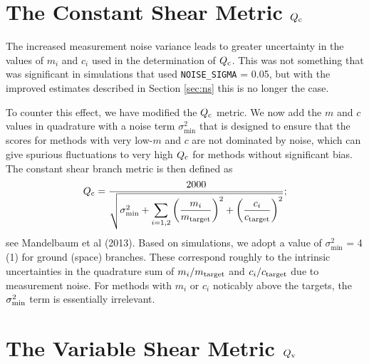 \documentclass[preprint,11pt]{aastex}
\begin{document}
\section{The Constant Shear Metric $Q_{\rm c}$}\label{sec:qc}
The increased measurement noise variance leads to greater
uncertainty in the values of $m_i$ and $c_i$ used in the determination
of $Q_{\rm c}$.  This was not something that was significant in
simulations that used \texttt{NOISE\_SIGMA} = 0.05, but with the
improved estimates described in Section \ref{sec:ns} this is no longer
the case.

To counter this effect, we have modified the $Q_{\rm c}$ metric. We
now add the $m$ and $c$ values in quadrature with a noise term
$\sigma_\text{min}^2$ that is designed to ensure that the scores for
methods with very low-$m$ and $c$ are not dominated by noise, which
can give spurious fluctuations to very high $Q_{\rm c}$ for methods
without significant bias.  The constant shear branch metric is then
defined as
\begin{equation}\label{eq:q_c}
Q_{\rm c} = \frac{2000}{\sqrt{ \sigma_\text{min}^2 + \displaystyle\sum_{i=1,2} \left(
      \frac{m_i}{m_{\rm target}} \right)^2 + \left( \frac{c_i}{c_{\rm target}} \right)^2 }};
\end{equation}
see Mandelbaum et al (2013).  Based on simulations, we adopt a value of
$\sigma_\text{min}^2$ = 4 (1) for ground (space) branches.  These
correspond roughly to the intrinsic uncertainties in the quadrature
sum of $m_i / m_{\rm target}$ and $c_i / c_{\rm target}$ due to
measurement noise. For methods with $m_i$ or $c_i$ noticably above the
targets, the $\sigma^2_{\rm min}$ term is essentially irrelevant.

\section{The Variable Shear Metric $Q_{\rm v}$}\label{sec:qv}
\end{document}
